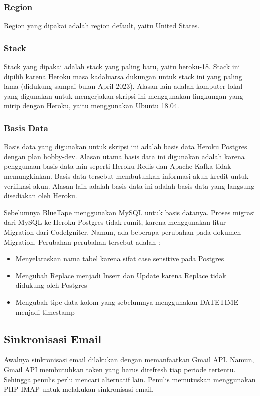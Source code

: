 	\subsubsection{Region}
		Region yang dipakai adalah region default, yaitu United States.
		
	\subsubsection{Stack}
		Stack yang dipakai adalah stack yang paling baru, yaitu heroku-18. Stack ini dipilih karena Heroku masa kadaluarsa dukungan untuk stack ini yang paling lama (didukung sampai bulan April 2023). Alasan lain adalah komputer lokal yang digunakan untuk mengerjakan skripsi ini menggunakan lingkungan yang mirip dengan Heroku, yaitu menggunakan Ubuntu 18.04.

	\subsubsection{Basis Data}
		Basis data yang digunakan untuk skripsi ini adalah basis data Heroku Postgres dengan plan hobby-dev. Alasan utama basis data ini digunakan adalah karena penggunaan basis data lain seperti Heroku Redis dan Apache Kafka tidak memungkinkan. Basis data tersebut membutuhkan informasi akun kredit untuk verifikasi akun. Alasan lain adalah basis data ini adalah basis data yang langsung disediakan oleh Heroku.
	
		Sebelumnya BlueTape menggunakan MySQL untuk basis datanya. Proses migrasi dari MySQL ke Heroku Postgres tidak rumit, karena menggunakan fitur Migration dari CodeIgniter. Namun, ada beberapa perubahan pada dokumen Migration. Perubahan-perubahan tersebut adalah :
	\begin{itemize}
		\item Menyelaraskan nama tabel karena sifat case sensitive pada Postgres
		\item Mengubah Replace menjadi Insert dan Update karena Replace tidak didukung oleh Postgres
		\item Mengubah tipe data kolom yang sebelumnya menggunakan DATETIME menjadi timestamp
	\end{itemize}  

\subsection{Sinkronisasi Email}
\label{sec:analisisemail}
	Awalnya sinkronisasi email dilakukan dengan memanfaatkan Gmail API. Namun, Gmail API membutuhkan token yang harus direfresh tiap periode tertentu. Sehingga penulis perlu mencari alternatif lain. Penulis memutuskan menggunakan PHP IMAP untuk melakukan sinkronisasi email.
	
